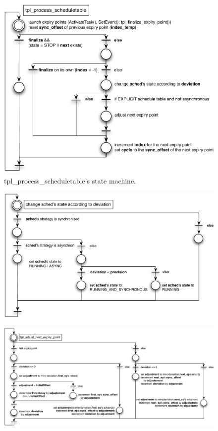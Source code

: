 \begin{figure}[H] %
   \centering
   \includegraphics[width=5in]{pictures/STprocessingTplProcess.pdf}  
   \caption{tpl_process_scheduletable's state machine.}
   \label{fig:STprocessingTplProcess}
\end{figure} 

\begin{figure}[H] %
   \centering
   \includegraphics[width=5in]{pictures/STprocessingChangeState.pdf}  
   \label{fig:STprocessingChangeState}
\end{figure}

\begin{figure}[H] %
   \centering
   \includegraphics[width=6in]{pictures/STprocessingTplAdjust.pdf}  
   \label{fig:STprocessingTplAdjust}
\end{figure}

